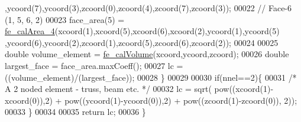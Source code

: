 \begin{DoxyCode}
      ,ycoord(7),ycoord(3),zcoord(0),zcoord(4),zcoord(7),zcoord(3));
00022         \textcolor{comment}{// Face-6 (1, 5, 6, 2)}
00023         face\_area(5) = \hyperlink{functions_8h_ac1306a43db522f3da30471d2a6c48686}{fe\_calArea\_4}(xcoord(1),xcoord(5),xcoord(6),xcoord(2),ycoord(1),ycoord(5)
      ,ycoord(6),ycoord(2),zcoord(1),zcoord(5),zcoord(6),zcoord(2));
00024 
00025         \textcolor{keywordtype}{double} volume\_element = \hyperlink{functions_8h_a00f586c9a4bc56ec486776402fc26605}{fe\_calVolume}(xcoord,ycoord,zcoord);
00026         \textcolor{keywordtype}{double} largest\_face = face\_area.maxCoeff();
00027         lc = ((volume\_element)/(largest\_face));
00028     \}
00029 
00030     \textcolor{keywordflow}{if}(nnel==2)\{
00031         \textcolor{comment}{/* A 2 noded element - truss, beam etc. */}
00032         lc = sqrt( pow((xcoord(1)-xcoord(0)),2) + pow((ycoord(1)-ycoord(0)),2) + pow((zcoord(1)-zcoord(0)),
      2));
00033     \}
00034 
00035         \textcolor{keywordflow}{return} lc;
00036 \}
\end{DoxyCode}

